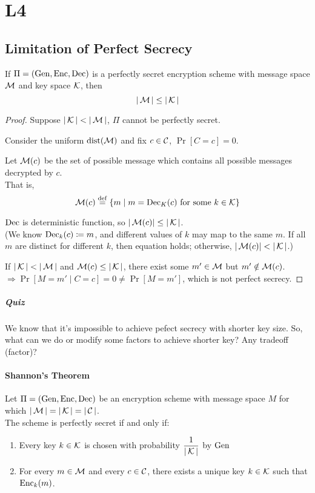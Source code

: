 \section{L4}


\subsection{Limitation of Perfect Secrecy}

\begin{theorem}
	If \(\Pi = (\operatorname{Gen}, \operatorname{Enc}, \operatorname{Dec})\) is a perfectly secret encryption  scheme with message space \(\operatorname{\mathcal{M}}\) and key space \(\operatorname{\mathcal{K}}\), then
	\[|\operatorname{\mathcal{M}}| \le |\operatorname{\mathcal{K}}| \]
\end{theorem}

\begin{proof}
	Suppose \(|\operatorname{\mathcal{K}}| < |\operatorname{\mathcal{M}}|\), \(\Pi\) cannot be perfectly secret.

	Consider the uniform \(\operatorname{dist}(\operatorname{\mathcal{M}})\) and fix \(c \in \operatorname{\mathcal{C}}\), \(\Pr[C = c] = 0\).
	
	Let \(\operatorname{\mathcal{M}}(c)\) be the set of possible message which contains all possible messages decrypted by \(c\). \\ That is,
	\[\operatorname{\mathcal{M}}(c) \overset{\mathrm{def}}{=} \{m \mid m = \operatorname{Dec}_K(c) \text{ for some } k \in \operatorname{\mathcal{K}}\}\]
	
	\(\operatorname{Dec}\) is deterministic function, so \(|\operatorname{\mathcal{M}}(c)| \le |\operatorname{\mathcal{K}}|\). \\
	(We know \(\operatorname{Dec}_k(c) \coloneq m\), and different values of \(k\) may map to the same \(m\). If all \(m\) are distinct for different \(k\), then equation holds; otherwise, \(|\operatorname{\mathcal{M}}(c)| < |\operatorname{\mathcal{K}}|\).)
	
	If \(|\operatorname{\mathcal{K}}| < |\operatorname{\mathcal{M}}|\) and \(\operatorname{\mathcal{M}}(c) \le |\operatorname{\mathcal{K}}|\), there exist some \(m' \in \operatorname{\mathcal{M}} \) but \(m' \notin \operatorname{\mathcal{M}}(c)\). \\
	\(\Rightarrow \Pr[M = m' \mid C = c] = 0 \neq \Pr[M = m']\), which is not perfect secrecy.
\end{proof}

\subparagraph{Quiz}

We know that it's impossible to achieve pefect secrecy with shorter key size. So, what can we do or modify some factors to achieve shorter key? Any tradeoff (factor)?


\paragraph{Shannon's Theorem}

\begin{theorem}
	Let \(\Pi = (\operatorname{Gen}, \operatorname{Enc}, \operatorname{Dec})\) be an encryption scheme with message space \(M\) for which \(|\operatorname{\mathcal{M}}|=|\operatorname{\mathcal{K}}|=|\operatorname{\mathcal{C}}|\). \\
	The scheme is perfectly secret if and only if:
	\begin{enumerate}[topsep=-\parskip]
		\item Every key \(k \in \operatorname{\mathcal{K}}\) is chosen with probability \(\displaystyle\frac{1}{|\operatorname{\mathcal{K}}|}\) by \(\operatorname{Gen}\)
		\item For every \(m \in \operatorname{\mathcal{M}}\) and every \(c \in \operatorname{\mathcal{C}}\), there exists a unique key \(k \in \operatorname{\mathcal{K}}\) such that \(\operatorname{Enc}_k(m)\).
	\end{enumerate}
\end{theorem}

